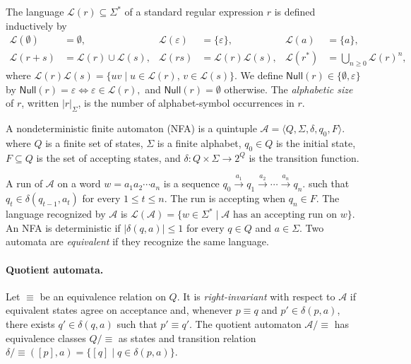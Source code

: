 The language $\mathcal L(r)\subseteq\Sigma^*$ of a standard regular expression $r$ is defined inductively by
\begin{equation}
\begin{aligned}
\mathcal L(\emptyset) &= \emptyset,&
\mathcal L(\varepsilon) &= \{\varepsilon\},&
\mathcal L(a) &= \{a\},\\
\mathcal L(r+s) &= \mathcal L(r)\cup \mathcal L(s),&
\mathcal L(rs) &= \mathcal L(r)\mathcal L(s),&
\mathcal L(r^*) &= \bigcup_{n\ge 0}\mathcal L(r)^n,
\end{aligned}
\end{equation}
where
$\mathcal L(r)\mathcal L(s)
=\{uv \mid u\in\mathcal L(r),\,v\in\mathcal L(s)\}$. We define $\mathsf{Null}(r)\in\{\emptyset,\varepsilon\}$ by $\mathsf{Null}(r)=\varepsilon \iff \varepsilon\in\mathcal{L}(r),$ and $\mathsf{Null}(r)=\emptyset$ otherwise. The \emph{alphabetic size} of $r$, written $|r|_\Sigma$, is the number of alphabet-symbol occurrences in $r$.



A nondeterministic finite automaton (NFA) is a quintuple $
\mathcal A=\langle Q,\Sigma,\delta,q_0,F\rangle .
\label{eq:nfa-definition}
$ where $Q$ is a finite set of states, $\Sigma$ is a finite
alphabet, $q_0\in Q$ is the initial state, $F\subseteq Q$ is the
set of accepting states, and
$\delta:Q\times\Sigma\longrightarrow 2^Q$ is the transition
function.

A run of $\mathcal A$ on a word $w=a_1a_2\cdots a_n$ is a sequence $
q_0 \xrightarrow{a_1} q_1
\xrightarrow{a_2}\cdots
\xrightarrow{a_n} q_n .
\label{eq:nfa-run}
$ such that $q_t\in\delta(q_{t-1},a_t)$ for every
$1\le t\le n$. The run is accepting when $q_n\in F$. The language
recognized by $\mathcal A$ is
$
\mathcal L(\mathcal A)
=
\{
w\in\Sigma^*
\mid
\mathcal A
\text{ has an accepting run on }w
\}.
\label{eq:nfa-language}
$ An NFA is deterministic if $|\delta(q,a)|\le 1$ for every
$q\in Q$ and $a\in\Sigma$. Two automata are \emph{equivalent}
if they recognize the same language.
\paragraph{Quotient automata.}

Let $\equiv$ be an equivalence relation on $Q$. It is
\emph{right-invariant} with respect to $\mathcal A$ if equivalent
states agree on acceptance and, whenever $p\equiv q$ and
$p'\in\delta(p,a)$, there exists $q'\in\delta(q,a)$ such that
$p'\equiv q'$. The quotient automaton $\mathcal A/{\equiv}$ has equivalence classes
$Q/{\equiv}$ as states and transition relation
$
\delta/{\equiv}([p],a)
=
\{[q]\mid q\in\delta(p,a)\}.
\label{eq:quotient-transition}
$


